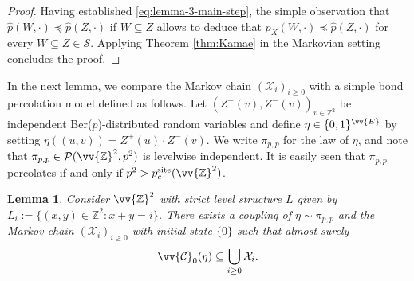 \documentclass[11pt]{article}
\newcommand{\Z}{\mathbb{Z}}
\newtheorem{lemma}{Lemma}
\theoremstyle{remark}
\begin{document}
\begin{proof}
	Having established \eqref{eq:lemma-3-main-step}, the simple observation that $\hat{p}(W,\boldsymbol{\cdot}) \preceq \hat{p}(Z,\boldsymbol{\cdot})$ if $W \subseteq Z$ allows to deduce that $p_X(W,\boldsymbol{\cdot}) \preceq\hat{p}(Z,\boldsymbol{\cdot})$ for every $W \subseteq Z \in \mathcal S$. Applying Theorem \ref{thm:Kamae} in the Markovian setting concludes the proof.
\end{proof}

In the next lemma, we compare the Markov chain $(\mathcal X_i)_{i\ge 0}$ with a simple bond percolation model defined as follows. Let $(Z^+(v),Z^-(v))_{v \in \Z^2}$ be independent Ber($p$)-distributed random variables and define $\eta \in \{0,1\}^{\vv{E}}$ by setting $\eta((u,v)) = Z^+(u) \cdot Z^-(v)$. We write $\pi_{p,p}$ for the law of $\eta$, and note that $\pi_{p,p} \in \mathcal P(\vv{\Z}^2,p^2)$ is levelwise independent. It is easily seen that $\pi_{p,p}$ percolates if and only if $p^2 > p_c^{\mathrm{site}}(\vv{\Z}^2)$.
\begin{lemma}\label{lem:markov-chain-lemma-2}
	Consider $\vv{\Z}^2$ with strict level structure $L$ given by $L_i := \{(x,y) \in \Z^2 : x+y=i \}$. There exists a coupling of $\eta \sim \pi_{p,p}$  and the Markov chain $(\mathcal X_i)_{i\ge 0}$ with initial state $\{0\}$ such that almost surely
	\begin{equation}
		\vv{\mathcal{C}}_0(\eta) \subseteq \bigcup_{i\ge 0} \mathcal X_i  .
	\end{equation}
\end{lemma}
\end{document}
